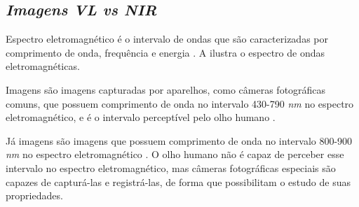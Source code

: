 

\subsection{\textit{Imagens \acrfull{VL} vs \acrfull{NIR}}}

\par Espectro eletromagnético é o intervalo de ondas que são caracterizadas por comprimento de onda, frequência e energia \cite{gonsalez2006}. A  ilustra o espectro de ondas eletromagnéticas.

%

Imagens \textit{} são imagens capturadas por aparelhos, como câmeras fotográficas comuns, que possuem comprimento de onda no intervalo 430-790 \textit{nm} no espectro eletromagnético, e é o intervalo perceptível pelo olho humano \cite{gonsalez2006}.

\par Já imagens  são imagens que possuem comprimento de onda no intervalo 800-900 \textit{nm} no espectro eletromagnético \cite{gonsalez2006}. O olho humano não é capaz de perceber esse intervalo no espectro eletromagnético, mas câmeras fotográficas especiais são capazes de capturá-las e registrá-las, de forma que possibilitam o estudo de suas propriedades\cite{nir}.


